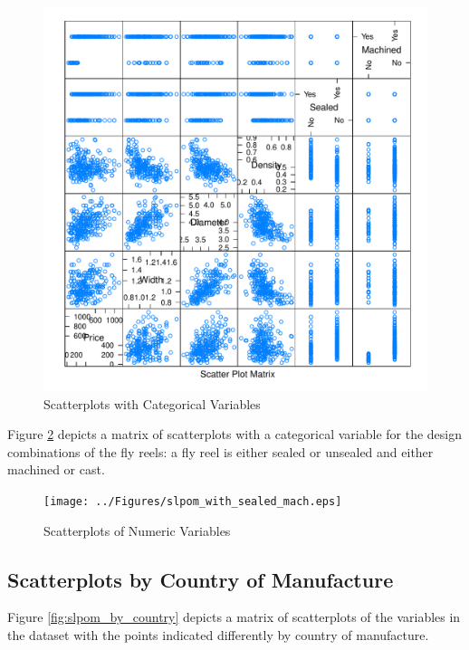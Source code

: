 \begin{figure}[h!]
  \centering
  \includegraphics[scale = 0.5, keepaspectratio=true]{../Figures/slpom_with_cat}
  \caption{Scatterplots with Categorical Variables} \label{fig:slpom_with_cat}
\end{figure}


\pagebreak


Figure \ref{fig:slpom_with_sealed_mach.eps} depicts a matrix of scatterplots
with a categorical variable for the design combinations of the fly reels:
a fly reel is either sealed or unsealed and either machined or cast.

\begin{figure}[h!]
  \centering
  \texttt{[image: ../Figures/slpom\_with\_sealed\_mach.eps]}
  \caption{Scatterplots of Numeric Variables} \label{fig:slpom_with_sealed_mach.eps}
\end{figure}



\pagebreak
\subsection{Scatterplots by Country of Manufacture}

Figure \ref{fig:slpom_by_country} depicts a matrix of scatterplots
of the variables in the dataset
with the points indicated differently by country of manufacture.

